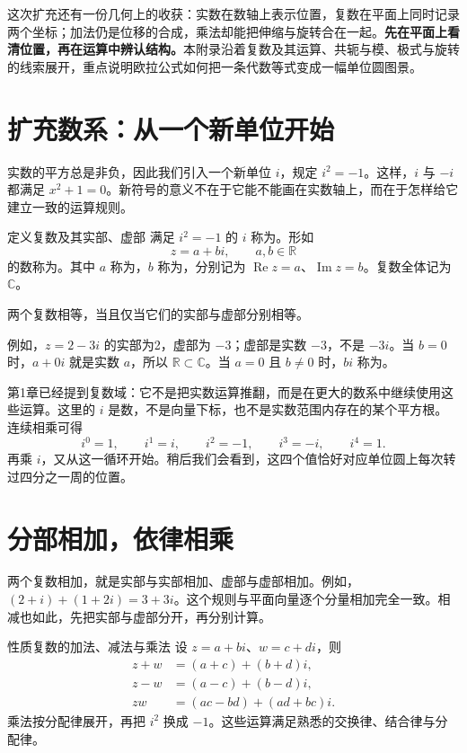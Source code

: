 \documentclass[a4paper,12pt,twoside,openany,fontset=none]{ctexbook}
\newenvironment{property}[1][]{\begin{thmBox}{性质}{#1}}{\end{thmBox}}
\newcounter{definition}[chapter]
\newenvironment{definition}[1][]{\begin{defBox}{定义}{#1}}{\end{defBox}}
\numberwithin{equation}{chapter}
\begin{document}
这次扩充还有一份几何上的收获：实数在数轴上表示位置，复数在平面上同时记录两个坐标；加法仍是位移的合成，乘法却能把伸缩与旋转合在一起。\textbf{先在平面上看清位置，再在运算中辨认结构。}本附录沿着复数及其运算、共轭与模、极式与旋转的线索展开，重点说明欧拉公式如何把一条代数等式变成一幅单位圆图景。

\section{扩充数系：从一个新单位开始}

实数的平方总是非负，因此我们引入一个新单位 $i$，规定 $i^2=-1$。这样，$i$ 与 $-i$ 都满足 $x^2+1=0$。新符号的意义不在于它能不能画在实数轴上，而在于怎样给它建立一致的运算规则。

\begin{definition}[复数及其实部、虚部]
满足 $i^2=-1$ 的 $i$ 称为\textbf{}。形如
\[
    z=a+bi,\qquad a,b\in\mathbb R
\]
的数称为\textbf{}。其中 $a$ 称为\textbf{}，$b$ 称为\textbf{}，分别记为 $\operatorname{Re}z=a$、$\operatorname{Im}z=b$。复数全体记为 $\mathbb C$。

两个复数相等，当且仅当它们的实部与虚部分别相等。
\end{definition}

例如，$z=2-3i$ 的实部为2，虚部为 $-3$；虚部是实数 $-3$，不是 $-3i$。当 $b=0$ 时，$a+0i$ 就是实数 $a$，所以 $\mathbb R\subset\mathbb C$。当 $a=0$ 且 $b\ne0$ 时，$bi$ 称为。

第1章已经提到复数域：它不是把实数运算推翻，而是在更大的数系中继续使用这些运算。这里的 $i$ 是数，不是向量下标，也不是实数范围内存在的某个平方根。连续相乘可得
\[
    i^0=1,\qquad i^1=i,\qquad i^2=-1,\qquad i^3=-i,\qquad i^4=1.
\]
再乘 $i$，又从这一循环开始。稍后我们会看到，这四个值恰好对应单位圆上每次转过四分之一周的位置。

\section{分部相加，依律相乘}

两个复数相加，就是实部与实部相加、虚部与虚部相加。例如，$(2+i)+(1+2i)=3+3i$。这个规则与平面向量逐个分量相加完全一致。相减也如此，先把实部与虚部分开，再分别计算。

\begin{property}[复数的加法、减法与乘法]
设 $z=a+bi$、$w=c+di$，则
\[
\begin{aligned}
    z+w&=(a+c)+(b+d)i,\\
    z-w&=(a-c)+(b-d)i,\\
    zw&=(ac-bd)+(ad+bc)i.
\end{aligned}
\]
乘法按分配律展开，再把 $i^2$ 换成 $-1$。这些运算满足熟悉的交换律、结合律与分配律。
\end{property}
\end{document}
